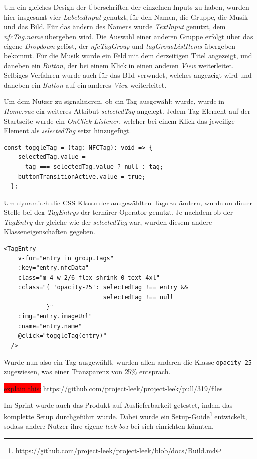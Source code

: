 \documentclass[10pt, a4paper]{article}
\begin{document}
Um ein gleiches Design der Überschriften der einzelnen Inputs zu haben, wurden hier insgesamt vier \textit{LabeledInput} genutzt, für den Namen, die Gruppe, die Musik und das Bild.
Für das ändern des Namens wurde \textit{TextInput} genutzt, dem \textit{nfcTag.name} übergeben wird.
Die Auswahl einer anderen Gruppe erfolgt über das eigene \textit{Dropdown} gelöst, der \textit{nfcTagGroup} und \textit{tagGroupListItems} übergeben bekommt.
Für die Musik wurde ein Feld mit dem derzeitigen Titel angezeigt, und daneben ein \textit{Button}, der bei einem Klick in einen anderen \textit{View} weiterleitet.
Selbiges Verfahren wurde auch für das Bild verwndet, welches angezeigt wird und daneben ein \textit{Button} auf ein anderes \textit{View} weiterleitet.

Um dem Nutzer zu signalisieren, ob ein Tag ausgewählt wurde, wurde in \textit{Home.vue} ein weiteres Attribut \textit{selectedTag} angelegt.
Jedem Tag-Element auf der Startseite wurde ein \textit{OnClick Listener}, welcher bei einem Klick das jeweilige Element als \textit{selectedTag} setzt hinzugefügt.
\begin{lstlisting}[caption={Hervorgeben aus ausgewähltem NFC-Tag}, captionpos=b]
  const toggleTag = (tag: NFCTag): void => {
    selectedTag.value =
      tag === selectedTag.value ? null : tag;
    buttonTransitionActive.value = true;
  };
\end{lstlisting}
Um dynamisch die CSS-Klasse der ausgewählten Tags zu ändern, wurde an dieser Stelle bei den \textit{TagEntrys} der ternärer Operator genutzt.
Je nachdem ob der \textit{TagEntry} der gleiche wie der \textit{selectedTag} war, wurden diesem andere Klasseneigenschaften gegeben.
\begin{lstlisting}[caption={Caption}, captionpos=b]
  <TagEntry
    v-for="entry in group.tags"
    :key="entry.nfcData"
    class="m-4 w-2/6 flex-shrink-0 text-4xl"
    :class="{ 'opacity-25': selectedTag !== entry &&
                            selectedTag !== null
            }"
    :img="entry.imageUrl"
    :name="entry.name"
    @click="toggleTag(entry)"
  />
\end{lstlisting}
Wurde nun also ein Tag ausgewählt, wurden allen anderen die Klasse \lstinline{opacity-25} zugewiesen, was einer Tranzparenz von 25\% entsprach.

\colorbox{red}{explain this:} https://github.com/project-leek/project-leek/pull/319/files

Im Sprint wurde auch das Produkt auf Auslieferbarkeit getestet, indem das komplette Setup durchgeführt wurde.
Dabei wurde ein Setup-Guide\footnote{https://github.com/project-leek/project-leek/blob/docs/Build.md} entwickelt, sodass andere Nutzer ihre eigene \textit{leek-box} bei sich einrichten könnten.
\end{document}
